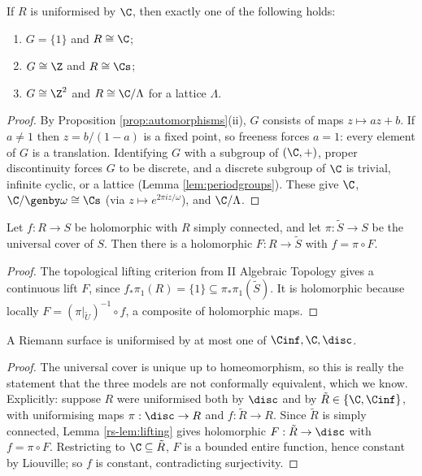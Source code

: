 \begin{proposition}\label{prop:uniformbyC}
	If $R$ is uniformised by $\C$, then exactly one of the following holds:
	\begin{enumerate}[label=(\roman*)]
		\item $G = \{1\}$ and $R \cong \C$;
		\item $G \cong \Z$ and $R \cong \Cs$;
		\item $G \cong \Z^2$ and $R\cong\C/\Lambda$ for a lattice $\Lambda$.
	\end{enumerate}
\end{proposition}

\begin{proof}
	By Proposition \ref{prop:automorphisms}(ii), $G$ consists of maps $z\mapsto az+b$. If
	$a \neq 1$ then $z = b/(1-a)$ is a fixed point, so freeness forces $a = 1$: every
	element of $G$ is a translation. Identifying $G$ with a subgroup of $(\C,+)$, proper
	discontinuity forces $G$ to be discrete, and a discrete subgroup of $\C$ is trivial,
	infinite cyclic, or a lattice (Lemma \ref{lem:periodgroups}). These give
	$\C$, $\C/\genby\omega \cong \Cs$ (via $z\mapsto e^{2\pi i z/\omega}$), and $\C/\Lambda$.
\end{proof}

\begin{lemma}\label{rs-lem:lifting}
	Let $f : R\to S$ be holomorphic with $R$ simply connected, and let $\pi : \tilde S\to S$
	be the universal cover of $S$. Then there is a holomorphic $F : R \to \tilde S$ with
	$f = \pi\circ F$.
\end{lemma}

\begin{proof}
	The topological lifting criterion from II Algebraic Topology gives a continuous lift
	$F$, since $f_*\pi_1(R) = \{1\} \subseteq \pi_*\pi_1(\tilde S)$. It is holomorphic
	because locally $F = (\pi|_{\tilde U})^{-1}\circ f$, a composite of holomorphic maps.
\end{proof}

\begin{proposition}
	A Riemann surface is uniformised by at most one of $\Cinf,\C,\disc$.
\end{proposition}

\begin{proof}
	The universal cover is unique up to homeomorphism, so this is really the statement that
	the three models are not conformally equivalent, which we know. Explicitly: suppose $R$
	were uniformised both by $\disc$ and by $\tilde R \in \{\C,\Cinf\}$, with uniformising
	maps $\pi : \disc \to R$ and $f : \tilde R \to R$. Since $\tilde R$ is simply connected,
	Lemma \ref{rs-lem:lifting} gives holomorphic $F : \tilde R \to \disc$ with $f = \pi\circ F$.
	Restricting to $\C \subseteq \tilde R$, $F$ is a bounded entire function, hence constant
	by Liouville; so $f$ is constant, contradicting surjectivity.
\end{proof}


